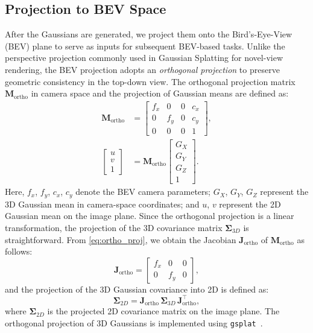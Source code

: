 \subsection{Projection to BEV Space}
\label{subsec:bev_projection}
After the Gaussians are generated, we project them onto the Bird’s-Eye-View (BEV) plane to serve as inputs for subsequent BEV-based tasks. 
Unlike the perspective projection commonly used in Gaussian Splatting for novel-view rendering, 
the BEV projection adopts an \textit{orthogonal projection} to preserve geometric consistency in the top-down view. 
The orthogonal projection matrix $\mathbf{M}_{\text{ortho}}$ in camera space and the projection of Gaussian means are defined as:
\begin{align}
\mathbf{M}_{\text{ortho}} &=
\begin{bmatrix}
\label{eq:ortho_proj}
f_x & 0 & 0 & c_x \\
0 & f_y & 0 & c_y \\
0 & 0 & 0 & 1
\end{bmatrix}, \\
\begin{bmatrix}
u \\ v \\ 1
\end{bmatrix}
&=
\mathbf{M}_{\text{ortho}}
\begin{bmatrix}
G_X \\ G_Y \\ G_Z \\ 1
\end{bmatrix}.
\end{align}
Here, $f_x$, $f_y$, $c_x$, $c_y$ denote the BEV camera parameters; $G_X$, $G_Y$, $G_Z$ represent the 3D Gaussian mean in camera-space coordinates; and $u$, $v$ represent the 2D Gaussian mean on the image plane.
Since the orthogonal projection is a linear transformation, 
the projection of the 3D covariance matrix $\boldsymbol{\Sigma}_{3D}$ is straightforward. 
From \cref{eq:ortho_proj}, we obtain the Jacobian $\mathbf{J}_{\text{ortho}}$ of $\mathbf{M}_{\text{ortho}}$ as follows:
\begin{equation}
\mathbf{J}_{\text{ortho}}
=
\begin{bmatrix}
f_x & 0 & 0 \\
0 & f_y & 0
\end{bmatrix},
\end{equation}
and the projection of the 3D Gaussian covariance into 2D is defined as:
\begin{equation}
\boldsymbol{\Sigma}_{2D}
= 
\mathbf{J}_{\text{ortho}}
\, \boldsymbol{\Sigma}_{3D} \,
\mathbf{J}_{\text{ortho}}^{\!\top},
\end{equation}
where $\boldsymbol{\Sigma}_{2D}$ is the projected 2D covariance matrix on the image plane. 
The orthogonal projection of 3D Gaussians is implemented using \texttt{gsplat}~\cite{ye2025gsplat}.

